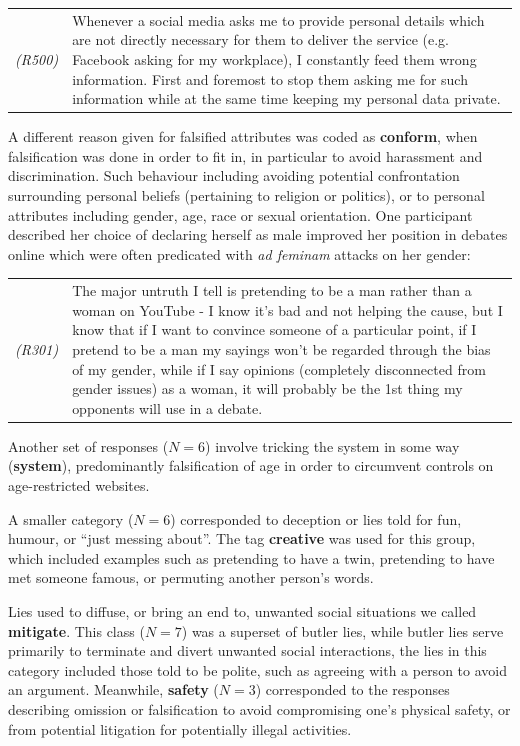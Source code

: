 \documentclass{sig-alternate}
\newcommand{\example}[2]{%

\vspace{0.10cm}

\hspace{-3.9ex} \begin{tabular}{ p{0.6cm} p{7.15cm} }
    {\it \small (R#1)} & #2 \\
\end{tabular}%
\vspace{0.10cm}

}
\begin{document}
\example{500}{Whenever a social media asks me to provide personal details which are not directly necessary for them to deliver the service (e.g. Facebook asking for my workplace), I constantly feed them wrong information. First and foremost to stop them asking me for such information while at the same time keeping my personal data private.}

A different reason given for falsified attributes was coded as \textbf{conform}, when falsification was done in order to fit in, in particular to avoid harassment and discrimination.  Such behaviour including avoiding potential confrontation surrounding personal beliefs (pertaining to religion or politics), or to personal attributes including gender, age, race or sexual orientation.  One participant described her choice of declaring herself as male improved her position in debates online which were often predicated with \emph{ad feminam} attacks on her gender:

\example{301}{The major untruth I tell is pretending to be a man rather than a woman on YouTube - I know it's bad and not helping the cause, but I know that if I want to convince someone of a particular point, if I pretend to be a man my sayings won't be regarded through the bias of my gender, while if I say opinions (completely disconnected from gender issues) as a woman, it will probably be the 1st thing my opponents will use in a debate.}

Another set of responses ($N=6$) involve tricking the system in some way (\textbf{system}), predominantly falsification of age in order to circumvent controls on age-restricted websites.


A smaller category  ($N=6$) corresponded to deception or lies told for fun, humour, or ``just messing about''. The tag \textbf{creative} was used for this group, which included examples such as pretending to have a twin, pretending to have met someone famous, or permuting another person's words.  

Lies used to diffuse, or bring an end to, unwanted social situations we called \textbf{mitigate}.  This class ($N=7$) was a superset of butler lies, while butler lies serve primarily to terminate and divert unwanted social interactions, the lies in this category included those told to be polite, such as agreeing with a person to avoid an argument. Meanwhile, \textbf{safety} ($N=3$) corresponded to the responses describing omission or falsification to avoid compromising one's physical safety, or from potential litigation for potentially illegal activities.
\end{document}
